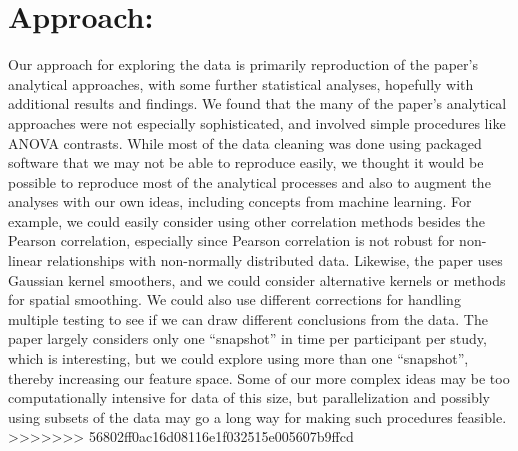 \documentclass[11pt]{article}
\begin{document}
\section{Approach:}
Our approach for exploring the data is primarily reproduction of the paper’s analytical approaches, with some further statistical analyses, hopefully with additional results and findings. We found that the many of the paper’s analytical approaches were not especially sophisticated, and involved simple procedures like ANOVA contrasts. While most of the data cleaning was done using packaged software that we may not be able to reproduce easily, we thought it would be possible to reproduce most of the analytical processes and also to augment the analyses with our own ideas, including concepts from machine learning. For example, we could easily consider using other correlation methods besides the Pearson correlation, especially since Pearson correlation is not robust for non-linear relationships with non-normally distributed data. Likewise, the paper uses Gaussian kernel smoothers, and we could consider alternative kernels or methods for spatial smoothing. We could also use different corrections for handling multiple testing to see if we can draw different conclusions from the data. The paper largely considers only one “snapshot” in time per participant per study, which is interesting, but we could explore using more than one “snapshot”, thereby increasing our feature space. Some of our more complex ideas may be too computationally intensive for data of this size, but parallelization and possibly using subsets of the data may go a long way for making such procedures feasible. 
>>>>>>> 56802ff0ac16d08116e1f032515e005607b9ffcd
\end{document}
